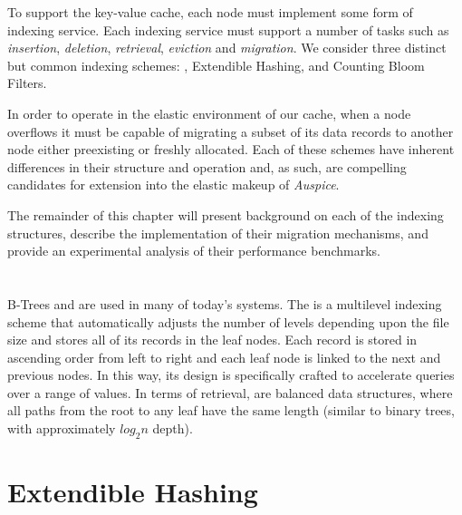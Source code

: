 To support the key-value cache, each node must implement some form of indexing
service. Each indexing service must support a number of tasks such as
\emph{insertion}, \emph{deletion}, \emph{retrieval}, \emph{eviction} and
\emph{migration}. We consider three distinct but common indexing schemes:
\bptrees\cite{btree,bplustree}, Extendible Hashing\cite{ullman}, and
Counting Bloom Filters\cite{countingbloom1,countingbloom2}.

In order to operate in the elastic environment of our cache, when a node
overflows it must be capable of migrating a subset of its data records to
another node either preexisting or freshly allocated. Each of these schemes
have inherent differences in their structure and operation and, as such, are
compelling candidates for extension into the elastic makeup of \emph{Auspice}.

The remainder of this chapter will present background on each of the indexing
structures, describe the implementation of their migration mechanisms, and
provide an experimental analysis of their performance benchmarks.

\section{\bptrees} %
\label{sec:b_trees}
B-Trees and \bptrees are used in many of today's systems. The \bptree is a
multilevel indexing scheme that automatically adjusts the number of levels
depending upon the file size and stores all of its records in the leaf nodes.
Each record is stored in ascending order from left to right and each leaf node
is linked to the next and previous nodes. In this way, its design is
specifically crafted to accelerate queries over a range of
values\cite{navathe,ullman}. In terms of retrieval, \bptrees are balanced data
structures, where all paths from the root to any leaf have the same length
(similar to binary trees, with approximately $log_2 n$ depth).



\section{Extendible Hashing} %
\label{sec:extendible_hashing}

